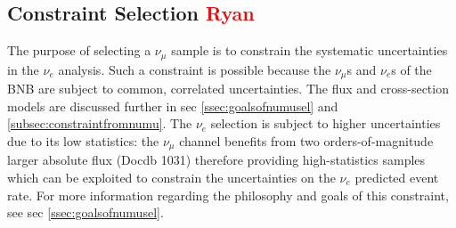 \subsection{Constraint Selection \textcolor{red}{Ryan}}
\label{ssec:NuMUCCsel:constr}
\par The purpose of selecting a $\nu_{\mu}$ sample is to constrain the systematic uncertainties in the $\nu_{e}$ analysis. Such a constraint is possible because the $\nu_{\mu}$s and $\nu_{e}$s of the BNB are subject to common, correlated uncertainties. The flux and cross-section models are discussed further in sec \ref{ssec:goalsofnumusel} and \ref{subsec:constraintfromnumu}. The $\nu_{e}$ selection is subject to higher uncertainties due to its low statistics: the $\nu_{\mu}$ channel benefits from two orders-of-magnitude larger absolute flux (Docdb 1031) therefore providing high-statistics samples which can be exploited to constrain the uncertainties on the $\nu_{e}$ predicted event rate. For more information regarding the philosophy and goals of this constraint, see sec \ref{ssec:goalsofnumusel}.

